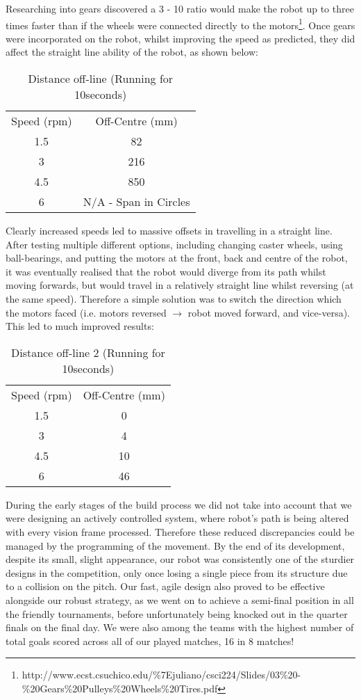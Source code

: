 Researching into gears discovered a 3 - 10 ratio would make the robot up to three times faster than if the wheels were connected directly to the motors\footnote{http://www.ecst.csuchico.edu/\%7Ejuliano/csci224/Slides/03\%20-\%20Gears\%20Pulleys\%20Wheels\%20Tires.pdf}. Once gears were incorporated on the robot, whilst improving the speed as predicted,  they did affect the straight line ability of the robot, as shown below:
\begin{table}[ht]
\caption{Distance off-line (Running for 10seconds)}
\centering
\begin{tabular}{c c}
\hline\hline
Speed (rpm) & Off-Centre (mm) \\
1.5 & 82 \\
3 & 216 \\
4.5 & 850 \\
6 & N/A - Span in Circles \\
\hline\hline
\end{tabular}
\label{table:offline}
\end{table}
Clearly increased speeds led to massive offsets in travelling in a straight line. After testing multiple different options, including changing caster wheels, using ball-bearings, and putting the motors at the front, back and centre of the robot, it was eventually realised that the robot would diverge from its path whilst moving forwards, but would travel in a relatively straight line whilst reversing (at the same speed). Therefore a simple solution was to switch the direction which the motors faced (i.e. motors reversed $\rightarrow$ robot moved forward, and vice-versa). This led to much improved results:
\begin{table}[ht]
\caption{Distance off-line 2 (Running for 10seconds)}
\centering
\begin{tabular}{c c}
\hline\hline
Speed (rpm) & Off-Centre (mm) \\
1.5 & 0 \\
3 & 4 \\
4.5 & 10\\
6 & 46\\
\hline\hline
\end{tabular}
\label{table:online}
\end{table}

During the early stages of the build process we did not take into account that we were designing an actively controlled system, where robot’s path is being altered with every vision frame processed. Therefore these reduced discrepancies could be managed by the programming of the movement.
By the end of its development, despite its small, slight appearance, our robot was consistently one of the sturdier designs in the competition, only once losing a single piece from its structure due to a collision on the pitch.  Our fast, agile design also proved to be effective alongside our robust strategy, as we went on to achieve a semi-final position in all the friendly tournaments, before unfortunately being knocked out in the quarter finals on the final day. We were also among the teams with the highest number of total goals scored across all of our played matches, 16 in 8 matches!